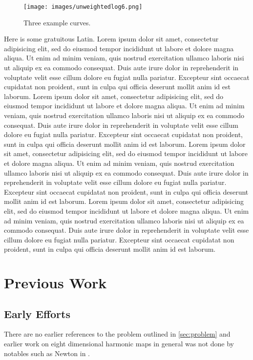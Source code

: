 \documentclass[11pt]{report}
\begin{document}
\begin{figure}[htb]
  \centering
    \texttt{[image: images/unweightedlog6.png]}
  \caption{\label{fig:unweightedlog6}
           Three example curves.}
\end{figure}

Here is some gratuitous Latin. Lorem ipsum dolor sit amet, consectetur adipisicing elit, sed do eiusmod tempor incididunt ut labore et dolore magna aliqua. Ut enim ad minim veniam, quis nostrud exercitation ullamco laboris nisi ut aliquip ex ea commodo consequat. Duis aute irure dolor in reprehenderit in voluptate velit esse cillum dolore eu fugiat nulla pariatur. Excepteur sint occaecat cupidatat non proident, sunt in culpa qui officia deserunt mollit anim id est laborum. Lorem ipsum dolor sit amet, consectetur adipisicing elit, sed do eiusmod tempor incididunt ut labore et dolore magna aliqua. Ut enim ad minim veniam, quis nostrud exercitation ullamco laboris nisi ut aliquip ex ea commodo consequat. Duis aute irure dolor in reprehenderit in voluptate velit esse cillum dolore eu fugiat nulla pariatur. Excepteur sint occaecat cupidatat non proident, sunt in culpa qui officia deserunt mollit anim id est laborum. Lorem ipsum dolor sit amet, consectetur adipisicing elit, sed do eiusmod tempor incididunt ut labore et dolore magna aliqua. Ut enim ad minim veniam, quis nostrud exercitation ullamco laboris nisi ut aliquip ex ea commodo consequat. Duis aute irure dolor in reprehenderit in voluptate velit esse cillum dolore eu fugiat nulla pariatur. Excepteur sint occaecat cupidatat non proident, sunt in culpa qui officia deserunt mollit anim id est laborum. Lorem ipsum dolor sit amet, consectetur adipisicing elit, sed do eiusmod tempor incididunt ut labore et dolore magna aliqua. Ut enim ad minim veniam, quis nostrud exercitation ullamco laboris nisi ut aliquip ex ea commodo consequat. Duis aute irure dolor in reprehenderit in voluptate velit esse cillum dolore eu fugiat nulla pariatur. Excepteur sint occaecat cupidatat non proident, sunt in culpa qui officia deserunt mollit anim id est laborum.

\section{Previous Work}
\subsection{Early Efforts}
There are no earlier references to the problem outlined in \ref{sec:problem} and earlier work on eight dimensional harmonic maps in general was not done by notables such as Newton in \cite{principia}.
\end{document}
